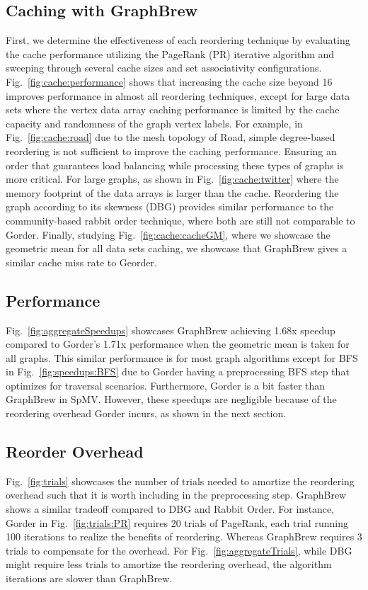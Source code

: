 \documentclass[sigconf, nonacm]{acmart}
\begin{document}
\subsection{Caching with GraphBrew}
First, we determine the effectiveness of each reordering technique by evaluating the cache performance utilizing the PageRank (PR) iterative algorithm and sweeping through several cache sizes and set associativity configurations. Fig.~\ref{fig:cache:performance} shows that increasing the cache size beyond \SI{16}{\mega\byte} improves performance in almost all reordering techniques, except for large data sets where the vertex data array caching performance is limited by the cache capacity and randomness of the graph vertex labels. For example, in Fig.~\ref{fig:cache:road} due to the mesh topology of Road, simple degree-based reordering is not sufficient to improve the caching performance. Ensuring an order that guarantees load balancing while processing these types of graphs is more critical. For large graphs, as shown in Fig.~\ref{fig:cache:twitter} where the memory footprint of the data arrays is larger than the cache. Reordering the graph according to its skewness (DBG) provides similar performance to the community-based rabbit order technique, where both are still not comparable to Gorder. Finally, studying Fig.~\ref{fig:cache:cacheGM}, where we showcase the geometric mean for all data sets caching, we showcase that GraphBrew gives a similar cache miss rate to Georder.

\subsection{Performance}
Fig.~\ref{fig:aggregateSpeedups} showcases GraphBrew achieving 1.68x speedup compared to Gorder's 1.71x performance when the geometric mean is taken for all graphs. This similar performance is for most graph algorithms except for BFS in Fig.~\ref{fig:speedups:BFS} due to Gorder having a preprocessing BFS step that optimizes for traversal scenarios. Furthermore, Gorder is a bit faster than GraphBrew in SpMV. However, these speedups are negligible because of the reordering overhead Gorder incurs, as shown in the next section.

\subsection{Reorder Overhead}
 Fig.~\ref{fig:trials} showcases the number of trials needed to amortize the reordering overhead such that it is worth including in the preprocessing step. GraphBrew shows a similar tradeoff compared to DBG and Rabbit Order. For instance, Gorder in  Fig.~\ref{fig:trials:PR} requires 20 trials of PageRank, each trial running 100 iterations to realize the benefits of reordering. Whereas GraphBrew requires 3 trials to compensate for the overhead. For  Fig.~\ref{fig:aggregateTrials}, while DBG might require less trials to amortize the reordering overhead, the algorithm iterations are slower than GraphBrew.
\end{document}
